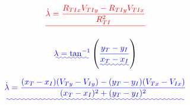 \documentclass[conference]{IEEEtran}
\providecommand{\DIFadd}[1]{{\protect\color{blue}\uwave{#1}}} %
\providecommand{\DIFdel}[1]{{\protect\color{red}\sout{#1}}}                      %
\providecommand{\DIFaddbegin}{} %
\providecommand{\DIFaddend}{} %
\providecommand{\DIFdelbegin}{} %
\providecommand{\DIFdelend}{} %
\newcommand{\DIFscaledelfig}{0.5}
\newlength{\DIFdelgraphicswidth} %
\newlength{\DIFdelgraphicsheight} %
\newcommand{\DIFaddincludegraphics}[2][]{{\color{blue}\fbox{\DIFOincludegraphics[#1]{#2}}}} %
\newcommand{\DIFdelincludegraphics}[2][]{%
\sbox{\DIFdelgraphicsbox}{\DIFOincludegraphics[#1]{#2}}%
\settoboxwidth{\DIFdelgraphicswidth}{\DIFdelgraphicsbox} %
\settoboxtotalheight{\DIFdelgraphicsheight}{\DIFdelgraphicsbox} %
\scalebox{\DIFscaledelfig}{%
\parbox[b]{\DIFdelgraphicswidth}{\usebox{\DIFdelgraphicsbox}\\[-\baselineskip] \rule{\DIFdelgraphicswidth}{0em}}\llap{\resizebox{\DIFdelgraphicswidth}{\DIFdelgraphicsheight}{%
\setlength{\unitlength}{\DIFdelgraphicswidth}%
\begin{picture}(1,1)%
\thicklines\linethickness{2pt} %
{\color[rgb]{1,0,0}\put(0,0){\framebox(1,1){}}}%
{\color[rgb]{1,0,0}\put(0,0){\line( 1,1){1}}}%
{\color[rgb]{1,0,0}\put(0,1){\line(1,-1){1}}}%
\end{picture}%
}\hspace*{3pt}}} %
} %
\DeclareRobustCommand{\DIFaddbegin}{\DIFOaddbegin \let\includegraphics\DIFaddincludegraphics} %
\DeclareRobustCommand{\DIFaddend}{\DIFOaddend \let\includegraphics\DIFOincludegraphics} %
\DeclareRobustCommand{\DIFdelbegin}{\DIFOdelbegin \let\includegraphics\DIFdelincludegraphics} %
\DeclareRobustCommand{\DIFdelend}{\DIFOaddend \let\includegraphics\DIFOincludegraphics} %
\begin{document}
 




\DIFdelbegin \begin{displaymath} \DIFdel{%
\dot{\lambda} = \frac{R_{TIx}V_{TIy}-R_{TIy}V_{TIx}}{R_{TI}^2}
}\end{displaymath}
\DIFdelend %


\begin{equation} \DIFdelbegin %
\DIFdelend \DIFaddbegin \label{eq:LOS}
\DIFadd{\lambda = \tan^{-1} }\left(\DIFadd{\frac{y_T - y_I}{x_T - x_I}}\right)
\DIFaddend \end{equation} 

\DIFdelend \DIFaddbegin \begin{equation} \DIFadd{\label{eq:losrate}
\dot{\lambda} = \frac{(x_T - x_I)(V_{Ty}-V_{Iy}) - (y_T - y_I)(V_{Tx}-V_{Ix})}{(x_T - x_I)^2+(y_T - y_I)^2}
}\end{equation}
\DIFaddend 



\DIFaddbegin 
\end{document}
